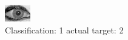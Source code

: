 \begin{figure}[h!]
\begin{center}
\includegraphics[width=0.60\columnwidth]{figures/ID1996_class_1_target_2.png}
\end{center}
\caption{ Classification: 1 actual target: 2}
\label{fig:ID1996_class_1_target_2}
\end{figure}
